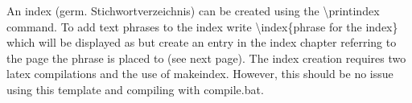 An index (germ. Stichwortverzeichnis) can be created using the \textbackslash printindex command.
To add text phrases to the index write \textbackslash index\{phrase for the index\} which will be displayed as  but create an entry in the index chapter referring to the page the phrase is placed to (see next page).
The index creation requires two latex compilations and the use of makeindex.
However, this should be no issue using this template and compiling with compile.bat.